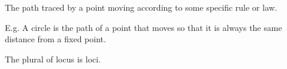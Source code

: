 The path traced by a point moving according to some 
specific rule or law.

\par
E.g. A circle is the path of a point that moves so that it is always the 
same distance from a fixed point. 
\par
The plural of locus is loci.
